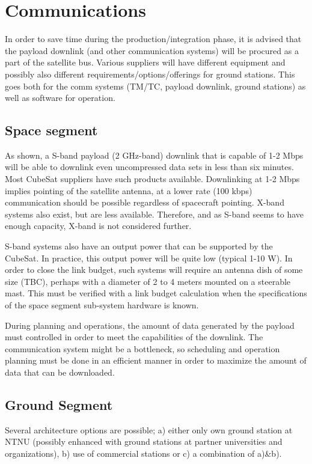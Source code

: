 \section{Communications}


In order to save time during the production/integration phase, it is advised that the payload downlink (and other communication systems) will be procured as a part of the satellite bus. Various suppliers will have different equipment and possibly also different requirements/options/offerings for ground stations. This goes both for the comm systems (TM/TC, payload downlink, ground stations) as well as software for operation. 

\subsection{Space segment}
As shown, a S-band payload (2 GHz-band) downlink that is capable of 1-2 Mbps will be able to downlink even uncompressed data sets in less than six minutes. Most CubeSat suppliers have such products available. Downlinking at 1-2 Mbps implies pointing of the satellite antenna, at a lower rate (100 kbps) communication should be possible regardless of spacecraft pointing. X-band systems also exist, but are less available. Therefore, and as S-band seems to have enough capacity, X-band is not considered further. 

S-band systems also have an output power that can be supported by the CubeSat. In practice, this output power will be quite low (typical 1-10 W). In order to close the link budget, such systems will require an antenna dish of some size (TBC), perhaps with a diameter of 2 to 4 meters mounted on a steerable mast. This must be verified with a link budget calculation when the specifications of the space segment sub-system hardware is known. 

During planning and operations, the amount of data generated by the payload must controlled in order to meet the capabilities of the downlink. The communication system might be a bottleneck, so scheduling and operation planning must be done in an efficient manner in order to maximize the amount of data that can be downloaded. 

\subsection{Ground Segment}
Several architecture options are possible; a) either only own ground station at NTNU (possibly enhanced with ground stations at partner universities and organizations), b) use of commercial stations or c) a combination of a)\&b). 


